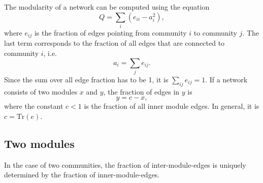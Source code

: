 The modularity of a network can be computed using the equation
\begin{equation}\label{eq:mod_undir}
Q=\sum _i \left( e_{ii}-a_i^2 \right),
\end{equation}
where $e_{ij}$ is the fraction of edges pointing from community $i$ to community $j$.
The last term corresponds to the fraction of all edges that are connected to community $i$, i.e.
\[
a_i = \sum _j e_{ij}.
\]
Since the sum over all edge fraction has to be 1, it is $\sum _{ij}e_{ij}=1$.
If a network consists of two modules $x$ and $y$, the fraction of edges in $y$ is
\begin{equation}\label{qmaxbedingung}
y=c-x,
\end{equation}
where the constant $c<1$ is the fraction of all inner module edges.
In general, it is $c=\mathrm{Tr} (e)$.

\subsection{Two modules}
In the case of two communities, the fraction of inter-module-edges is uniquely determined by the fraction of inner-module-edges.

